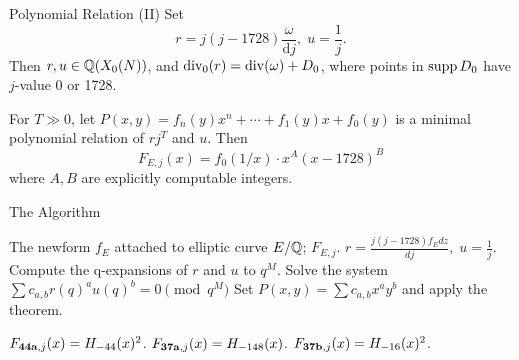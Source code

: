 \documentclass[handout]{beamer}
\begin{document}
\begin{frame}{Polynomial Relation (II)}
Set \[
r = j(j-1728)  \frac{\omega }{{\mathrm{d}j}}, \;  u = \frac{1}{j}.
\]
Then $r, u \in \mathbb{Q}(X_0(N))$, and $\operatorname{div}_0(r)  = \operatorname{div}(\omega) + D_0$, where points in $\operatorname{supp} D_0$ have $j$-value 0 or 1728.  \\

\smallskip 

\pause


\begin{Prop}[C.]
For $T \gg 0$, let $P(x,y) = f_n(y)x^n + \cdots + f_1(y)x + f_0(y)$ is a minimal polynomial relation of $rj^T$ and $u$. Then
\[
		F_{E,j}(x) = f_0(1/x) \cdot x^{A} (x - 1728)^B
\]	
where $A,B$ are explicitly computable integers. 
\end{Prop}

\end{frame}

\begin{frame}{The Algorithm}

\begin{algorithm}[H]
\begin{algorithmic}[[1]
\Require The newform $f_E$ attached to elliptic curve $E/\mathbb{Q}$; 
\Ensure $F_{E,j}$.  
\State $r = \frac{j(j-1728) f_E dz }{dj}, \;  u = \frac{1}{j}$. 
\State Compute the q-expansions of $r$ and $u$ to $q^M$. 
\State Solve the system $\sum c_{a,b}r(q)^au(q)^b = 0 \pmod {q^M} $
\State Set $P(x,y) = \sum c_{a,b}x^ay^b$ and apply the theorem.
\end{algorithmic}
\end{algorithm}
\begin{Example}
$F_{{\bf 44a},j}(x) = H_{-44}(x)^2$. $F_{{\bf 37a},j}(x) = H_{-148}(x)$. $F_{{\bf 37b},j}(x) = H_{-16}(x)^2$.
\end{Example}


\end{frame}


\end{document}
